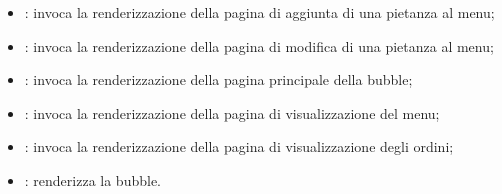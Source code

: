 \begin{itemize}
	\item {}: invoca la renderizzazione della pagina di aggiunta di una pietanza al menu;
	\item {}: invoca la renderizzazione della pagina di modifica di una pietanza al menu;
	\item {}: invoca la renderizzazione della pagina principale della bubble;
	\item {}: invoca la renderizzazione della pagina di visualizzazione del menu;
	\item {}: invoca la renderizzazione della pagina di visualizzazione degli ordini;
	\item {}: renderizza la bubble.
	
\end{itemize}